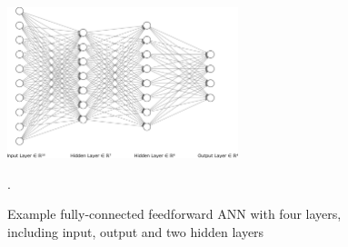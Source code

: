 \begin{figure}
	\centering
	\includegraphics[width=0.6\textwidth]{img/nn}
	\caption{Example fully-connected feedforward ANN with four layers, including input, output and two hidden layers \cite{LeNail2019}}.
	\label{nn}
\end{figure}

